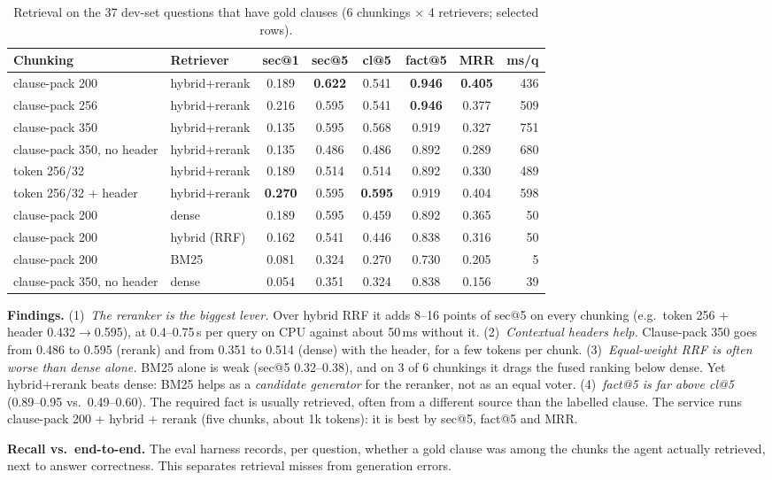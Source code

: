 \begin{table}[h]
\centering\small
\caption{Retrieval on the 37 dev-set questions that have gold clauses (6 chunkings $\times$ 4 retrievers; selected
rows).}
\label{tab:retr}
\begin{tabular}{@{}llcccccr@{}}
\toprule
Chunking & Retriever & sec@1 & sec@5 & cl@5 & fact@5 & MRR & ms/q \\
\midrule
clause-pack 200 & hybrid+rerank & 0.189 & \textbf{0.622} & 0.541 & \textbf{0.946} & \textbf{0.405} & 436 \\
clause-pack 256 & hybrid+rerank & 0.216 & 0.595 & 0.541 & \textbf{0.946} & 0.377 & 509 \\
clause-pack 350 & hybrid+rerank & 0.135 & 0.595 & 0.568 & 0.919 & 0.327 & 751 \\
clause-pack 350, no header & hybrid+rerank & 0.135 & 0.486 & 0.486 & 0.892 & 0.289 & 680 \\
token 256/32 & hybrid+rerank & 0.189 & 0.514 & 0.514 & 0.892 & 0.330 & 489 \\
token 256/32 + header & hybrid+rerank & \textbf{0.270} & 0.595 & \textbf{0.595} & 0.919 & 0.404 & 598 \\
\midrule
clause-pack 200 & dense & 0.189 & 0.595 & 0.459 & 0.892 & 0.365 & 50 \\
clause-pack 200 & hybrid (RRF) & 0.162 & 0.541 & 0.446 & 0.838 & 0.316 & 50 \\
clause-pack 200 & BM25 & 0.081 & 0.324 & 0.270 & 0.730 & 0.205 & 5 \\
clause-pack 350, no header & dense & 0.054 & 0.351 & 0.324 & 0.838 & 0.156 & 39 \\
\bottomrule
\end{tabular}
\end{table}

\textbf{Findings.}
(1)~\emph{The reranker is the biggest lever.} Over hybrid RRF it adds 8--16 points of sec@5 on every chunking
(e.g.\ token 256 + header 0.432$\to$0.595), at 0.4--0.75\,s per query on CPU against about 50\,ms without it.
(2)~\emph{Contextual headers help.} Clause-pack 350 goes from 0.486 to 0.595 (rerank) and from 0.351 to 0.514
(dense) with the header, for a few tokens per chunk.
(3)~\emph{Equal-weight RRF is often worse than dense alone.} BM25 alone is weak (sec@5 0.32--0.38), and on 3 of 6
chunkings it drags the fused ranking below dense. Yet hybrid+rerank beats dense: BM25 helps as a \emph{candidate
generator} for the reranker, not as an equal voter.
(4)~\emph{fact@5 is far above cl@5} (0.89--0.95 vs.\ 0.49--0.60). The required fact is usually retrieved, often from
a different source than the labelled clause.
The service runs clause-pack 200 + hybrid + rerank (five chunks, about 1k tokens): it is best by sec@5, fact@5 and
MRR.

\textbf{Recall vs.\ end-to-end.} The eval harness records, per question, whether a gold clause was among the chunks
the agent actually retrieved, next to answer correctness. This separates retrieval misses from generation errors.
